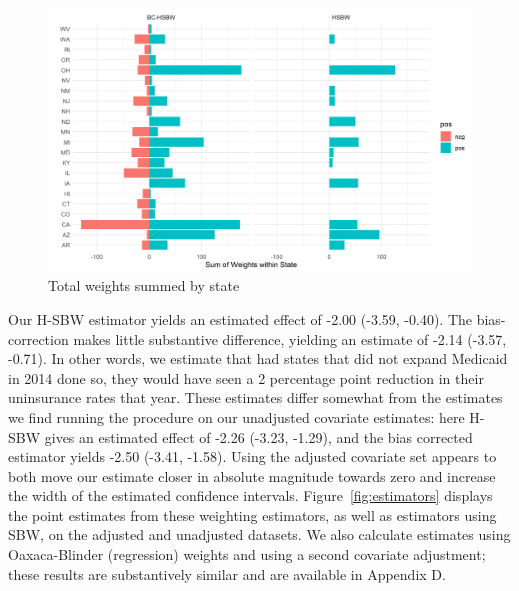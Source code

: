 \documentclass[12pt]{article}
\begin{document}
\begin{figure}[B]
\begin{center}
    \includegraphics[scale=0.6]{01_Plots/weights-by-state-main.png}
    \caption{Total weights summed by state}
    \label{fig:statewghts}
\end{center}
\end{figure}

Our H-SBW estimator yields an estimated effect of -2.00 (-3.59, -0.40). The bias-correction makes little substantive difference, yielding an estimate of -2.14 (-3.57, -0.71). In other words, we estimate that had states that did not expand Medicaid in 2014 done so, they would have seen a 2 percentage point reduction in their uninsurance rates that year. These estimates differ somewhat from the estimates we find running the procedure on our unadjusted covariate estimates: here H-SBW gives an estimated effect of -2.26 (-3.23, -1.29), and the bias corrected estimator yields -2.50 (-3.41, -1.58). Using the adjusted covariate set appears to both move our estimate closer in absolute magnitude towards zero and increase the width of the estimated confidence intervals. Figure~\ref{fig:estimators} displays the point estimates from these weighting estimators, as well as estimators using SBW, on the adjusted and unadjusted datasets. We also calculate estimates using Oaxaca-Blinder (regression) weights and using a second covariate adjustment; these results are substantively similar and are available in Appendix D. 
\end{document}
